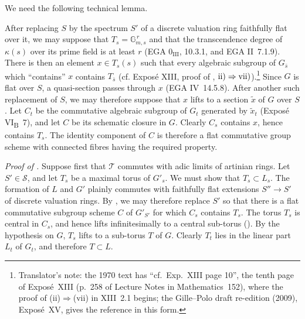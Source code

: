 We need the following technical lemma.


After replacing \(S\) by the spectrum \(S'\) of a discrete valuation
ring faithfully flat over it, we may suppose that
\(T_s=\mathbb G_{m,s}^{\,r}\) and that the transcendence degree of
\(\kappa(s)\) over its prime field is at least \(r\)
(EGA \(0_{\mathrm{III}}\), 10.3.1, and EGA II~7.1.9). There is then
an element \(x\in T_s(s)\) such that every algebraic subgroup of
\(G_{\bar s}\) which ``contains'' \(x\) contains \(T_{\bar s}\)
(cf. Exposé XIII, proof of ,
\(\textup{ii)}\Rightarrow\textup{vii)}\)).\footnote{Translator's note: the
1970 text has ``cf.\ Exp.\ XIII page 10'', the tenth page of Exposé~XIII
(p.~258 of Lecture Notes in Mathematics~152), where the proof of
(ii)\(\Rightarrow\)(vii) in XIII~2.1 begins; the Gille--Polo draft
re-edition (2009), Exposé~XV, gives the reference in this form.}
Since \(G\) is flat over \(S\), a quasi-section passes through \(x\)
(EGA IV~14.5.8). After another such replacement of \(S\), we may
therefore suppose that \(x\) lifts to a section
\(\widetilde x\) of \(G\) over \(S\). Let \(C_t\) be the commutative
algebraic subgroup of \(G_t\) generated by \(\widetilde x_t\)
(Exposé VI\textsubscript{B}~7), and let \(C\) be its schematic
closure in \(G\). Clearly \(C_s\) contains \(x\), hence contains
\(T_s\). The identity component of \(C\) is therefore a flat
commutative group scheme with connected fibres having the required
property.

\medskip\noindent\textit{Proof of .}
Suppose first that \(\mathcal T\) commutes with adic limits of
artinian rings. Let \(S'\in\mathcal S\), and let \(T_s\) be a maximal
torus of \(G'_s\). We must show that \(T_s\subset L_s\). The
formation of \(L\) and \(G'\) plainly commutes with faithfully flat
extensions \(S''\to S'\) of discrete valuation rings. By ,
we may therefore replace \(S'\) so that there is a flat commutative
subgroup scheme \(C\) of \(G'_{S'}\) for which \(C_s\) contains
\(T_s\). The torus \(T_s\) is central in \(C_s\), and hence lifts
infinitesimally to a central sub-torus (). By the
hypothesis on \(G\), \(T_s\) lifts to a sub-torus \(T\) of \(G\).
Clearly \(T_t\) lies in the linear part \(L_t\) of \(G_t\), and
therefore \(T\subset L\).

